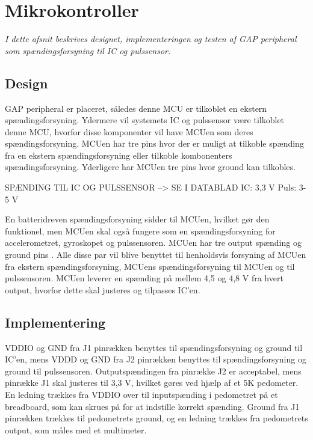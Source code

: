 \section{Mikrokontroller}
\textit{I dette afsnit beskrives designet, implementeringen og testen af GAP peripheral som spændingsforsyning til IC og pulssensor.}

\subsection{Design}
GAP peripheral er placeret, således denne MCU er tilkoblet en ekstern spændingsforsyning. Ydermere vil systemets IC og pulssensor være tilkoblet denne MCU, hvorfor disse komponenter vil have MCUen som deres spændingsforsyning. \newline
MCUen har tre pins hvor der er muligt at tilkoble spænding fra en ekstern spændingsforsyning eller tilkoble kombonenters spændingsforsyning. Yderligere har MCUen tre pins hvor ground kan tilkobles. \citep{Semiconductor2016}

SPÆNDING TIL IC OG PULSSENSOR --> SE I DATABLAD
IC: 3,3 V
Puls: 3-5 V

En batteridreven spændingsforsyning sidder til MCUen, hvilket gør den funktionel, men MCUen skal også fungere som en spændingsforsyning for accelerometret, gyroskopet og pulssensoren. MCUen har tre output spænding og ground pins \citep{Semiconductor2016}. Alle disse par vil blive benyttet til henholdsvis forsyning af MCUen fra ekstern spændingsforsyning, MCUens spændingsforsyning til MCUen og til pulssensoren. MCUen leverer en spænding på mellem 4,5 og 4,8 V fra hvert output, hvorfor dette skal justeres og tilpasses IC'en.

\subsection{Implementering}
VDDIO og GND fra J1 pinrækken benyttes til spændingsforsyning og ground til IC'en, mens VDDD og GND fra J2 pinrækken benyttes til spændingsforsyning og ground til pulssensoren. Outputspændingen fra pinrække J2 er acceptabel, mens pinrække J1 skal justeres til 3,3 V, hvilket gøres ved hjælp af et 5K pedometer. En ledning trækkes fra VDDIO over til inputspænding i pedometret på et breadboard, som kan skrues på for at indstille korrekt spænding. Ground fra J1 pinrækken trækkes til pedometrets ground, og en ledning trækkes fra pedometrets output, som måles med et multimeter.

